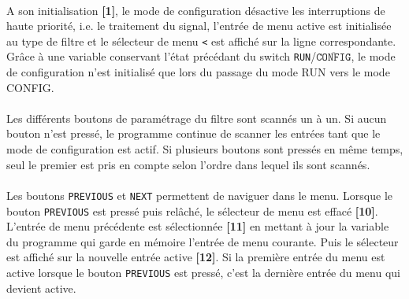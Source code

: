 \documentclass{article}
\begin{document}
    \paragraph{}
    A son initialisation \textbf{[1]}, le mode de configuration désactive les interruptions de haute priorité, i.e. le traitement du signal, l'entrée de menu active est initialisée au type de filtre et le sélecteur de menu \texttt{<} est affiché sur la ligne correspondante. Grâce à une variable conservant l'état précédant du switch \texttt{RUN}/$\overline{\texttt{CONFIG}}$, le mode de configuration n'est initialisé que lors du passage du mode RUN vers le mode CONFIG.

    \paragraph{}
    Les différents boutons de paramétrage du filtre sont scannés un à un. Si aucun bouton n'est pressé, le programme continue de scanner les entrées tant que le mode de configuration est actif. Si plusieurs boutons sont pressés en même temps, seul le premier est pris en compte selon l'ordre dans lequel ils sont scannés.

    \paragraph{}
    Les boutons \texttt{PREVIOUS} et \texttt{NEXT} permettent de naviguer dans le menu. Lorsque le bouton \texttt{PREVIOUS} est pressé puis relâché, le sélecteur de menu est effacé \textbf{[10]}. L'entrée de menu précédente est sélectionnée \textbf{[11]} en mettant à jour la variable du programme qui garde en mémoire l'entrée de menu courante. Puis le sélecteur est affiché sur la nouvelle entrée active \textbf{[12]}. Si la première entrée du menu est active lorsque le bouton \texttt{PREVIOUS} est pressé, c'est la dernière entrée du menu qui devient active.
\end{document}

